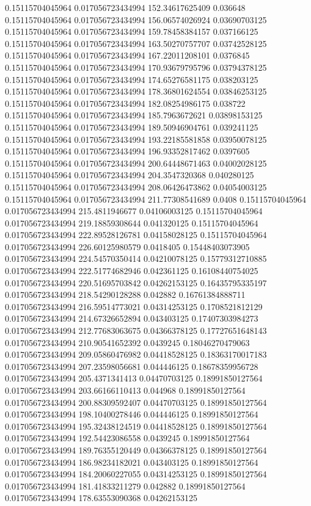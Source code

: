 0.15115704045964 0.017056723434994 152.34617625409 0.036648
0.15115704045964 0.017056723434994 156.06574026924 0.03690703125
0.15115704045964 0.017056723434994 159.78458384157 0.037166125
0.15115704045964 0.017056723434994 163.50270757707 0.03742528125
0.15115704045964 0.017056723434994 167.22011208101 0.0376845
0.15115704045964 0.017056723434994 170.93679795796 0.03794378125
0.15115704045964 0.017056723434994 174.65276581175 0.038203125
0.15115704045964 0.017056723434994 178.36801624554 0.03846253125
0.15115704045964 0.017056723434994 182.08254986175 0.038722
0.15115704045964 0.017056723434994 185.7963672621 0.03898153125
0.15115704045964 0.017056723434994 189.50946904761 0.039241125
0.15115704045964 0.017056723434994 193.22185581858 0.03950078125
0.15115704045964 0.017056723434994 196.93352817462 0.0397605
0.15115704045964 0.017056723434994 200.64448671463 0.04002028125
0.15115704045964 0.017056723434994 204.3547320368 0.040280125
0.15115704045964 0.017056723434994 208.06426473862 0.04054003125
0.15115704045964 0.017056723434994 211.77308541689 0.0408
0.15115704045964 0.017056723434994 215.4811946677 0.04106003125
0.15115704045964 0.017056723434994 219.18859308644 0.041320125
0.15115704045964 0.017056723434994 222.89528126781 0.04158028125
0.15115704045964 0.017056723434994 226.60125980579 0.0418405
0.15448403073905 0.017056723434994 224.54570350414 0.04210078125
0.15779312710885 0.017056723434994 222.51774682946 0.042361125
0.16108440754025 0.017056723434994 220.51695703842 0.04262153125
0.16435795335197 0.017056723434994 218.54290128288 0.042882
0.16761384888711 0.017056723434994 216.59514773021 0.04314253125
0.1708521812129 0.017056723434994 214.67326652894 0.043403125
0.17407303984273 0.017056723434994 212.77683063675 0.04366378125
0.17727651648143 0.017056723434994 210.90541652392 0.0439245
0.18046270479063 0.017056723434994 209.05860476982 0.04418528125
0.18363170017183 0.017056723434994 207.23598056681 0.044446125
0.18678359956728 0.017056723434994 205.4371341413 0.04470703125
0.18991850127564 0.017056723434994 203.66166110413 0.044968
0.18991850127564 0.017056723434994 200.88309592407 0.04470703125
0.18991850127564 0.017056723434994 198.10400278446 0.044446125
0.18991850127564 0.017056723434994 195.32438124519 0.04418528125
0.18991850127564 0.017056723434994 192.54423086558 0.0439245
0.18991850127564 0.017056723434994 189.76355120449 0.04366378125
0.18991850127564 0.017056723434994 186.98234182021 0.043403125
0.18991850127564 0.017056723434994 184.20060227055 0.04314253125
0.18991850127564 0.017056723434994 181.41833211279 0.042882
0.18991850127564 0.017056723434994 178.63553090368 0.04262153125
